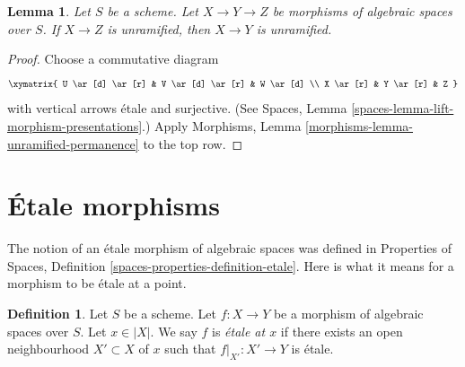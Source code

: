 \documentclass{stacks-project}
\theoremstyle{plain}
\newtheorem{lemma}[subsection]{Lemma}
\theoremstyle{definition}
\newtheorem{definition}[subsection]{Definition}
\theoremstyle{remark}
\numberwithin{equation}{subsection}
\begin{document}
\begin{lemma}
\label{lemma-permanence-unramified}
Let $S$ be a scheme.
Let $X \to Y \to Z$ be morphisms of algebraic spaces over $S$.
If $X \to Z$ is unramified, then $X \to Y$ is unramified.
\end{lemma}

\begin{proof}
Choose a commutative diagram
$$
\xymatrix{
U \ar[d] \ar[r] & V \ar[d] \ar[r] & W \ar[d] \\
X \ar[r] & Y \ar[r] & Z
}
$$
with vertical arrows \'etale and surjective. (See
Spaces, Lemma \ref{spaces-lemma-lift-morphism-presentations}.)
Apply
Morphisms, Lemma \ref{morphisms-lemma-unramified-permanence}
to the top row.
\end{proof}














\section{\'Etale morphisms}
\label{section-etale}

\noindent
The notion of an \'etale morphism of algebraic spaces was defined in
Properties of Spaces, Definition \ref{spaces-properties-definition-etale}.
Here is what it means for a morphism to be \'etale at a point.

\begin{definition}
\label{definition-etale}
Let $S$ be a scheme.
Let $f : X \to Y$ be a morphism of algebraic spaces over $S$.
Let $x \in |X|$. We say $f$ is {\it \'etale at $x$} if there
exists an open neighbourhood $X' \subset X$ of $x$ such that
$f|_{X'} : X' \to Y$ is \'etale.
\end{definition}
\end{document}

